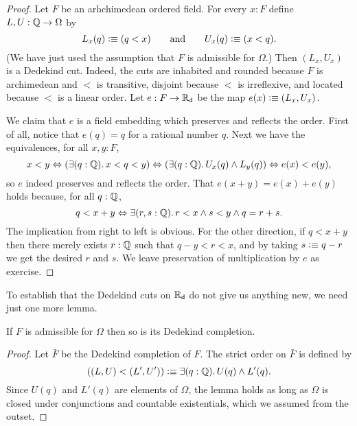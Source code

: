 \begin{proof}
  Let $F$ be an arhchimedean ordered field. For every $x : F$ define $L, U : \mathbb{Q} \to
  \Omega$ by
  \begin{equation*}
    L_x(q) \vcentcolon\equiv (q < x)
    \qquad\text{and}\qquad
    U_x(q) \vcentcolon\equiv (x < q).
  \end{equation*}
  (We have just used the assumption that $F$ is admissible for $\Omega$.)
  Then $(L_x, U_x)$ is a Dedekind cut. Indeed, the cuts are inhabited and rounded because
  $F$ is archimedean and $<$ is transitive, disjoint because $<$ is irreflexive, and
  located because $<$ is a linear order. Let $e : F \to \mathbb{R}_\mathsf{d}$ be the map $e(x) \vcentcolon\equiv (L_x,
  U_x)$.

  We claim that $e$ is a field embedding which preserves and reflects the order. First of
  all, notice that $e(q) = q$ for a rational number $q$. Next we have the equivalences,
  for all $x, y : F$,
  \begin{equation*}
    x < y \Leftrightarrow
    (\exis{q : \Q} x < q < y) \Leftrightarrow
    (\exis{q : \Q} U_x(q) \land L_y(q)) \Leftrightarrow
    e(x) < e(y),
  \end{equation*}
  so $e$ indeed preserves and reflects the order. That $e(x + y) = e(x) + e(y)$ holds
  because, for all $q : \mathbb{Q}$,
  \begin{equation*}
    q < x + y \Leftrightarrow
    \exis{r, s : \Q} r < x \land s < y \land q = r + s.
  \end{equation*}
  The implication from right to left is obvious. For the other direction, if $q < x +
  y$ then there merely exists $r : \mathbb{Q}$ such that $q - y < r < x$, and by taking $s \vcentcolon\equiv
  q - r$ we get the desired $r$ and $s$. We leave preservation of multiplication by $e$ as
  exercise.
\end{proof}

To establish that the Dedekind cuts on $\mathbb{R}_\mathsf{d}$ do not give us anything new, we need just one
more lemma.

\begin{lem} \label{lem:cuts-preserve-admissibility}
  If $F$ is admissible for $\Omega$ then so is its Dedekind completion.
\end{lem}

\begin{proof}
  Let $\bar{F}$ be the Dedekind completion of $F$. The strict order on $\bar{F}$ is
  defined by
  \begin{equation*}
    ((L,U) < (L',U')) \defeq \exis{q : \Q} U(q) \land L'(q).
  \end{equation*}
  Since $U(q)$ and $L'(q)$ are elements of $\Omega$, the lemma holds as long as $\Omega$
  is closed under conjunctions and countable existentials, which we assumed from the outset.
\end{proof}



